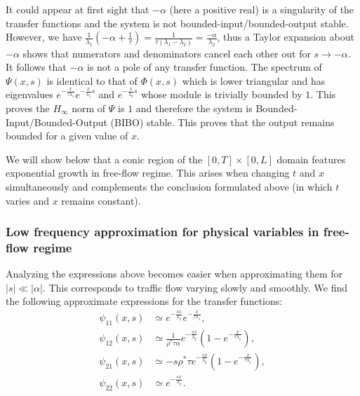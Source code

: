 \documentclass[5p,twocolumn]{elsarticle}
\begin{document}
It could appear at first sight that $-\alpha$ (here a positive real) is a singularity of the transfer functions and the system is not bounded-input/bounded-output stable. However, we have $\frac{1}{\lambda_{1}}\left(-\alpha+\frac{1}{\tau}\right)=\frac{1}{\tau\left(\lambda_{1} - \lambda_{2}\right)}=\frac{-\alpha}{\lambda_{2}}$, thus a Taylor expansion about $-\alpha$ shows that numerators and denominators cancel each other out for $s \rightarrow -\alpha$. It follows that $-\alpha$ is not a pole of any transfer function. 
The spectrum of $\Psi(x,s)$ is identical to that of $\Phi(x,s)$ which is lower triangular and has eigenvalues 
$
e^{ - \frac{x}{\tau \lambda_1}}
e^{ - \frac{x}{\lambda_1} s}
$
and
$
e^{ - \frac{x}{\lambda_2} s}
$
whose module is trivially bounded by $1$.
This proves the $H_{\infty}$ norm of $\Psi$ is $1$ and therefore the system is Bounded-Input/Bounded-Output (BIBO) stable. This proves that the output remains bounded for a given value of $x$. 

We will show below that a conic region of the $\left[0,T\right] \times \left[0,L\right]$ domain features exponential growth in free-flow regime. This arises when changing $t$ and $x$ simultaneously and complements the conclusion formulated above (in which $t$ varies and $x$ remains constant).

\subsubsection{Low frequency approximation for physical variables in free-flow regime}
Analyzing the expressions above becomes easier when approximating them for $\left|s\right|\ll\left|\alpha\right|$. This corresponds to traffic flow varying slowly and smoothly. We find the following approximate expressions for the transfer functions:
\begin{subequations}
\begin{align}
\psi_{11}(x,s)
&\simeq
e^{-\frac{sx}{\lambda_{2}}}
e^{-\frac{x}{\tau\lambda_{1}}}
, \\
\psi_{12}(x,s)
&\simeq
\frac{
	1
}{
	\rho^{*}\tau\alpha
}
e^{-\frac{sx}{\lambda_{2}}}
\left(
	1 - e^{-\frac{x}{\tau\lambda_{1}}}
\right)
, \\
\psi_{21}(x,s)
& \simeq
- s \rho^{*} \tau
e^{-\frac{sx}{\lambda_{2}}}
\left(
	1 - e^{-\frac{x}{\tau\lambda_{1}}}
\right)
, \\
\psi_{22}(x,s)
&\simeq
e^{-\frac{sx}{\lambda_{2}}}
.
\end{align}
\end{subequations}
\end{document}
